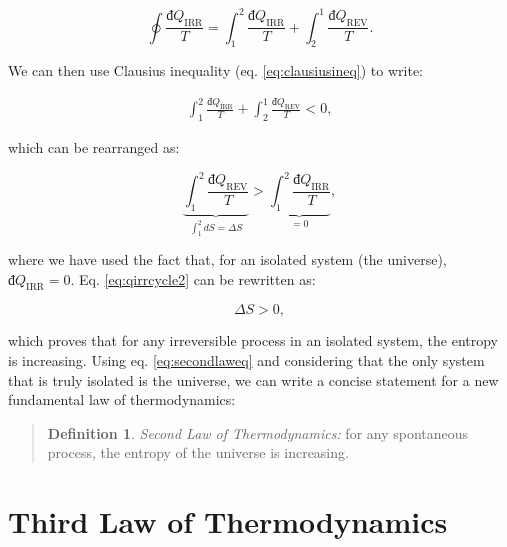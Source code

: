 \documentclass[
]{book}
\theoremstyle{definition}
\newtheorem{definition}{Definition}[chapter]
\theoremstyle{definition}
\theoremstyle{definition}
\theoremstyle{remark}
\begin{document}
\begin{equation}
\oint \frac{đQ_{\mathrm{IRR}}}{T} = \int_1^2 \frac{đQ_{\mathrm{IRR}}}{T} + \int_2^1 \frac{đQ_{\mathrm{REV}}}{T}.
\label{eq:qirrcycle}
\end{equation}

We can then use Clausius inequality (eq. \eqref{eq:clausiusineq}) to write:

\begin{equation}
\begin{aligned}
\int_1^2 \frac{đQ_{\mathrm{IRR}}}{T} + \int_2^1 \frac{đQ_{\mathrm{REV}}}{T} < 0,
\end{aligned}
\label{eq:qirrcycle1}
\end{equation}

which can be rearranged as:

\begin{equation}
\underbrace{\int_1^2 \frac{đQ_{\mathrm{REV}}}{T}}_{\int_1^2 dS = \Delta S} > \underbrace{\int_1^2 \frac{đQ_{\mathrm{IRR}}}{T}}_{=0},
\label{eq:qirrcycle2}
\end{equation}

where we have used the fact that, for an isolated system (the universe), \(đQ_{\mathrm{IRR}}=0\). Eq. \eqref{eq:qirrcycle2} can be rewritten as:

\begin{equation}
\Delta S > 0,
\label{eq:secondlaweq}
\end{equation}

which proves that for any irreversible process in an isolated system, the entropy is increasing. Using eq. \eqref{eq:secondlaweq} and considering that the only system that is truly isolated is the universe, we can write a concise statement for a new fundamental law of thermodynamics:

\begin{quote}
\begin{definition}
\protect\hypertarget{def:secondlawdef}{}{\label{def:secondlawdef} }\emph{Second Law of Thermodynamics:} for any spontaneous process, the entropy of the universe is increasing.
\end{definition}
\end{quote}

\renewcommand*{\standardstate}{{-\kern-6pt{\ominus}\kern-6pt-}}

\hypertarget{thirdlaw}{%
\chapter{Third Law of Thermodynamics}\label{thirdlaw}}
\end{document}
